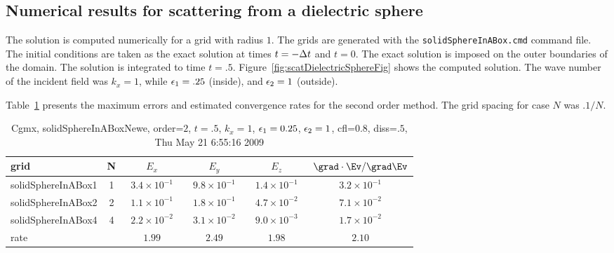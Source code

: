 \clearpage
\subsection{Numerical results for scattering from a dielectric sphere}





The solution is computed numerically for a grid with radius $1$. The grids are generated
with the {\tt solidSphereInABox.cmd} command file. 
The initial conditions are taken as the exact solution at times $t=-{\Delta t}$ and $t=0$.  
The exact solution is imposed on the
outer boundaries of the domain. The solution is integrated to time $t=.5$. 
% 
Figure~\ref{fig:scatDielectricSphereFig} shows the computed solution.
The wave number of the incident field was $k_x=1$, while $\epsilon_1=.25$ (inside), and $\epsilon_2=1$ (outside).


Table~\ref{table:dielectricSphereOrder2} presents the maximum errors and estimated convergence rates
for the second order method. The grid spacing for case $N$ was $.1/N$. 

\begin{table}[hbt]\tableFont %
\begin{center}
\begin{tabular}{|l|c|c|c|c|c|} \hline 
grid  & N &  $E_x$ &  $E_y$ & $E_z$ & $\grad\cdot\Ev/\grad\Ev$\\ \hline 
  solidSphereInABox1 &     1 & ~$3.4\times10^{ -1}$~ & ~$9.8\times10^{ -1}$~ & ~$1.4\times10^{ -1}$~ & ~$3.2\times10^{ -1}$~  \\ \hline
  solidSphereInABox2 &     2 & ~$1.1\times10^{ -1}$~ & ~$1.8\times10^{ -1}$~ & ~$4.7\times10^{ -2}$~ & ~$7.1\times10^{ -2}$~  \\ \hline
  solidSphereInABox4 &     4 & ~$2.2\times10^{ -2}$~ & ~$3.1\times10^{ -2}$~ & ~$9.0\times10^{ -3}$~ & ~$1.7\times10^{ -2}$~  \\ \hline
    rate             &       &       $1.99$          &       $2.49$          &       $1.98$          &       $2.10$           \\ \hline
\end{tabular}
\caption{Cgmx, solidSphereInABoxNewe, order=$2$, $t=.5$, $k_x=1$, $\epsilon_1=0.25$, $\epsilon_2=1$, cfl=$0.8$, diss=$.5$, Thu May 21  6:55:16 2009}\label{table:dielectricSphereOrder2}
\end{center}
\end{table}



